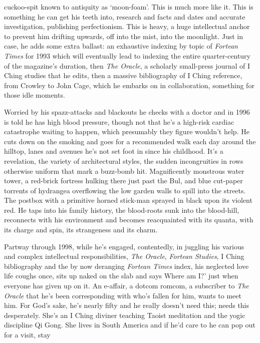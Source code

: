 \documentclass[
]{article}
\begin{document}
cuckoo-spit known to antiquity as `moon-foam'. This is much more like
it. This is something he can get his teeth into, research and facts and
dates and accurate investigation, publishing perfectionism. This is
heavy, a huge intellectual anchor to prevent him drifting upwards, off
into the mist, into the moonlight. Just in case, he adds some extra
ballast: an exhaustive indexing by topic of \emph{Fortean Times} for
1993 which will eventually lead to indexing the entire quarter-century
of the magazine's duration, then \emph{The Oracle}, a scholarly
small-press journal of I Ching studies that he edits, then a massive
bibliography of I Ching reference, from Crowley to John Cage, which he
embarks on in collaboration, something for those idle moments. \par
Worried by his spazz-attacks and blackouts he checks with a doctor
and in 1996 is told he has high blood pressure, though not that he's a
high-risk cardiac catastrophe waiting to happen, which presumably they
figure wouldn't help. He cuts down on the smoking and goes for a
recommended walk each day around the hilltop, lanes and avenues he's not
set foot in since his childhood. It's a revelation, the variety of
architectural styles, the sudden incongruities in rows otherwise uniform
that mark a buzz-bomb hit. Magnificently monstrous water tower, a
red-brick fortress hulking there just past the Bul, and blue cut-paper
torrents of hydrangea overflowing the low garden walls to spill into the
streets. The postbox with a primitive horned stick-man sprayed in black
upon its violent red. He taps into his family history, the blood-roots
sunk into the blood-hill, reconnects with his environment and becomes
reacquainted with its quanta, with its charge and spin, its strangeness
and its charm. \par
Partway through 1998, while he's engaged, contentedly, in juggling
his various and complex intellectual responsibilities, \emph{The
Oracle}, \emph{Fortean Studies}, I Ching bibliography and the by now
deranging \emph{Fortean Times} index, his neglected love life coughs
once, sits up naked on the slab and says Where am I?' just when everyone
has given up on it. An e-affair, a dotcom romcom, a subscriber to
\emph{The Oracle} that he's been corresponding with who's fallen for
him, wants to meet him. For God's sake, he's nearly fifty and he really
doesn't need this; needs this desperately. She's an I Ching diviner
teaching Taoist meditation and the yogic discipline Qi Gong. She lives
in South America and if he'd care to he can pop out for a visit, stay
\end{document}
